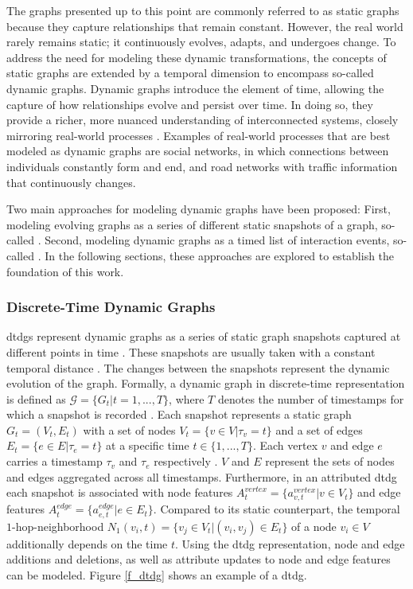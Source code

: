 The graphs presented up to this point are commonly referred to as static graphs \cite{kazemi_representation_2019, rossi_temporal_2020, you_roland_2022} because they capture relationships that remain constant. However, the real world rarely remains static; it continuously evolves, adapts, and undergoes change. To address the need for modeling these dynamic transformations, the concepts of static graphs are extended by a temporal dimension to encompass so-called dynamic graphs. Dynamic graphs introduce the element of time, allowing the capture of how relationships evolve and persist over time. In doing so, they provide a richer, more nuanced understanding of interconnected systems, closely mirroring real-world processes \cite{you_roland_2022, xu_inductive_2020, trivedi_dyrep_2019}. Examples of real-world processes that are best modeled as dynamic graphs are social networks, in which connections between individuals constantly form and end, and road networks with traffic information that continuously changes.

Two main approaches for modeling dynamic graphs have been proposed: First, modeling evolving graphs as a series of different static snapshots of a graph, so-called  \cite{he_explainer_2022, xie_explaining_2022}. Second, modeling dynamic graphs as a timed list of interaction events, so-called  \cite{rossi_temporal_2020, trivedi_dyrep_2019}. In the following sections, these approaches are explored to establish the foundation of this work.

\subsubsection{Discrete-Time Dynamic Graphs}
\label{s_Background_Graphs_DTDGs}
\glspl{dtdg} represent dynamic graphs as a series of static graph snapshots captured at different points in time \cite{rossi_temporal_2020}. These snapshots are usually taken with a constant temporal distance \cite{souza_provably_2022}. The changes between the snapshots represent the dynamic evolution of the graph. Formally, a dynamic graph in discrete-time representation is defined as $\mathcal{G} = \{G_t | t = 1,...,T\}$, where $T$ denotes the number of timestamps for which a snapshot is recorded \cite{you_roland_2022}. Each snapshot represents a static graph $G_t = (V_t, E_t)$ with a set of nodes $V_t = \{v \in V | \tau_v = t\}$ and a set of edges $E_t = \{e \in E | \tau_e = t\}$ at a specific time $t \in \{1, ..., T\}$. Each vertex $v$ and edge $e$ carries a timestamp $\tau_v$ and $\tau_e$ respectively \cite{you_roland_2022}. $V$ and $E$ represent the sets of nodes and edges aggregated across all timestamps. Furthermore, in an attributed \gls{dtdg} each snapshot is associated with node features $A_t^{vertex} = \{a_{v,t}^{vertex} | v \in V_t\}$ and edge features $A_t^{edge} = \{a_{e,t}^{edge} | e \in E_t\}$. Compared to its static counterpart, the temporal $1$-hop-neighborhood $N_1(v_i, t) = \{v_j \in V_t | (v_i, v_j) \in E_t\}$ of a node $v_i \in V$ additionally depends on the time $t$. Using the \gls{dtdg} representation, node and edge additions and deletions, as well as attribute updates to node and edge features can be modeled. Figure \ref{f_dtdg} shows an example of a \gls{dtdg}.


